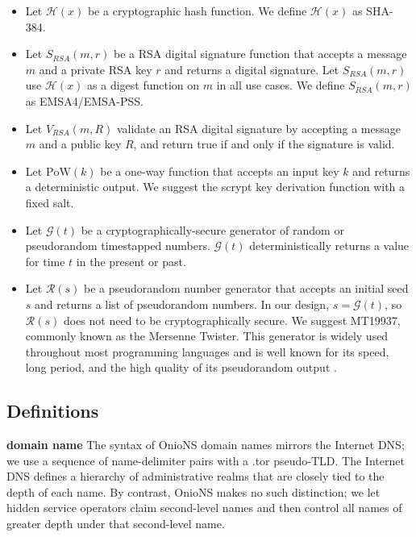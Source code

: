 \documentclass[USenglish,oneside,twocolumn]{article}
\begin{document}
\begin{itemize}
	\item Let $ \mathcal{H}(x) $ be a cryptographic hash function. We define $ \mathcal{H}(x) $ as SHA-384.
	\item Let $ S_{\mathit{RSA}}(m, r) $ be a RSA digital signature function that accepts a message $ m $ and a private RSA key $ r $ and returns a digital signature. Let $ S_{\mathit{RSA}}(m, r) $ use $ \mathcal{H}(x) $ as a digest function on $ m $ in all use cases. We define $ S_{\mathit{RSA}}(m, r) $ as EMSA4/EMSA-PSS.
	\item Let $ V_{\mathit{RSA}}(m, R) $ validate an RSA digital signature by accepting a message $ m $ and a public key $ R $, and return true if and only if the signature is valid.
	\item Let $ \mathrm{PoW}(k) $ be a one-way function that accepts an input key $ k $ and returns a deterministic output. We suggest the scrypt \cite{percival2012scrypt} key derivation function with a fixed salt.
	\item Let $ \mathcal{G}(t) $ be a cryptographically-secure generator of random or pseudorandom timestapped numbers. $ \mathcal{G}(t) $ deterministically returns a value for time $ t $ in the present or past.
	\item Let $ \mathcal{R}(s) $ be a pseudorandom number generator that accepts an initial seed $ s $ and returns a list of pseudorandom numbers. In our design, $ s = \mathcal{G}(t) $, so $ \mathcal{R}(s) $ does not need to be cryptographically secure. We suggest MT19937, commonly known as the Mersenne Twister. This generator is widely used throughout most programming languages and is well known for its speed, long period, and the high quality of its pseudorandom output \cite{matsumoto1998mersenne}.
\end{itemize}

\subsection{Definitions}

\textbf{domain name} The syntax of OnioNS domain names mirrors the Internet DNS; we use a sequence of name-delimiter pairs with a .tor pseudo-TLD. The Internet DNS defines a hierarchy of administrative realms that are closely tied to the depth of each name. By contrast, OnioNS makes no such distinction; we let hidden service operators claim second-level names and then control all names of greater depth under that second-level name.
\end{document}
